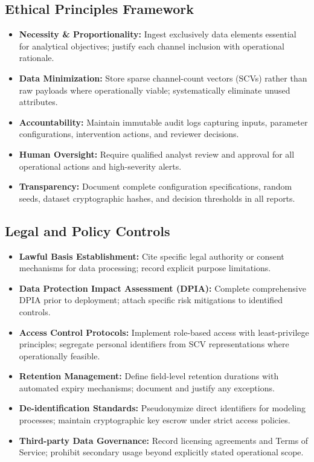 \documentclass[12pt]{article}
\theoremstyle{plain}
\begin{document}
\subsection{Ethical Principles Framework}
\begin{itemize}\itemsep0.2em
\item \textbf{Necessity \& Proportionality:} Ingest exclusively data elements essential for analytical objectives; justify each channel inclusion with operational rationale.
\item \textbf{Data Minimization:} Store sparse channel-count vectors (SCVs) rather than raw payloads where operationally viable; systematically eliminate unused attributes.
\item \textbf{Accountability:} Maintain immutable audit logs capturing inputs, parameter configurations, intervention actions, and reviewer decisions.
\item \textbf{Human Oversight:} Require qualified analyst review and approval for all operational actions and high-severity alerts.
\item \textbf{Transparency:} Document complete configuration specifications, random seeds, dataset cryptographic hashes, and decision thresholds in all reports.
\end{itemize}

\subsection{Legal and Policy Controls}
\begin{itemize}\itemsep0.2em
\item \textbf{Lawful Basis Establishment:} Cite specific legal authority or consent mechanisms for data processing; record explicit purpose limitations.
\item \textbf{Data Protection Impact Assessment (DPIA):} Complete comprehensive DPIA prior to deployment; attach specific risk mitigations to identified controls.
\item \textbf{Access Control Protocols:} Implement role-based access with least-privilege principles; segregate personal identifiers from SCV representations where operationally feasible.
\item \textbf{Retention Management:} Define field-level retention durations with automated expiry mechanisms; document and justify any exceptions.
\item \textbf{De-identification Standards:} Pseudonymize direct identifiers for modeling processes; maintain cryptographic key escrow under strict access policies.
\item \textbf{Third-party Data Governance:} Record licensing agreements and Terms of Service; prohibit secondary usage beyond explicitly stated operational scope.
\end{itemize}
\end{document}
